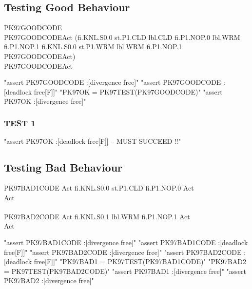 \subsection{Testing Good Behaviour}
\begin{circus}
\circprocess PK97GOODCODE \circdef \circbegin\\
PK97GOODCODEAct \circdef (fi.KNL.S0.0
  \then st.P1.CLD \then lbl.CLD \then fi.P1.NOP.0 \then lbl.WRM \then fi.P1.NOP.1
  \then fi.KNL.S0.0
  \then st.P1.WRM \then lbl.WRM \then fi.P1.NOP.1
  \then PK97GOODCODEAct)\\
 \circspot PK97GOODCODEAct\\
   \circend
\end{circus}
\begin{assert}
"assert PK97GOODCODE :[divergence free]"
\also "assert PK97GOODCODE :[deadlock free[F]]"
\also "PK97OK = PK97TEST(PK97GOODCODE)"
\also "assert PK97OK :[divergence free]"
\end{assert}
\subsubsection{TEST 1}
\begin{assert}
"assert PK97OK :[deadlock free[F]]  -- MUST SUCCEED !!"
\end{assert}

\subsection{Testing Bad Behaviour}
\begin{circus}
\circprocess PK97BAD1CODE \circdef \circbegin
  Act \circdef fi.KNL.S0.0 \then st.P1.CLD \then fi.P1.NOP.0 \then Act\\
  \circspot Act\\
 \circend\\
\circprocess PK97BAD2CODE \circdef\circbegin
  Act \circdef fi.KNL.S0.1 \then lbl.WRM \then fi.P1.NOP.1 \then Act\\
  \circspot Act\\
 \circend
 \end{circus}
\begin{assert}
"assert PK97BAD1CODE :[divergence free]"
\also "assert PK97BAD1CODE :[deadlock free[F]]"
\also "assert PK97BAD2CODE :[divergence free]"
\also "assert PK97BAD2CODE :[deadlock free[F]]"
\also "PK97BAD1 = PK97TEST(PK97BAD1CODE)"
\also "PK97BAD2 = PK97TEST(PK97BAD2CODE)"
\also "assert PK97BAD1 :[divergence free]"
\also "assert PK97BAD2 :[divergence free]"
\end{assert}
